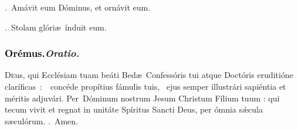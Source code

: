 \documentclass[12pt]{article} %
\def\capitulumSpace{\hspace{20 mm}}
\let\oldgresixstar\gresixstar
\renewcommand{\gresixstar}{\textcolor{benred8}{\oldgresixstar}}
\let\oldgredagger\gredagger
\renewcommand{\gredagger}{\textcolor{benred8}{\oldgredagger}}
\let\oldVbar\Vbar
\renewcommand{\Vbar}{\textcolor{benred8}{\oldVbar .}}
\let\oldRbar\Rbar
\renewcommand{\Rbar}{\textcolor{benred8}{\oldRbar .}}
\newenvironment{response}{\leftskip 0in \setlength{\parindent}{0in}}{\vspace{2 mm}}
\begin{document}




\begin{response}
\Vbar\ Am\'{a}vit eum D\'{o}minus, et orn\'{a}vit eum.

\Rbar\ Stolam gl\'{o}ri\ae\ \'{i}nduit eum.

\end{response}

\subsubsection*{\textcolor{black}{Or\'{e}mus.}\capitulumSpace \emph{Oratio.}}

\begin{response}\lettrine{D}{e}us, qui Eccl\'{e}siam tuam be\'{a}ti Bed\ae\ Confess\'{o}ris tui atque Doct\'{o}ris eruditi\'{o}ne clar\'{i}ficas~:~\gredagger\ conc\'{e}de prop\'{i}tius f\'{a}mulis tuis, \gresixstar\ ejus semper illustr\'{a}ri sapi\'{e}ntia et m\'{e}ritis adjuv\'{a}ri. Per~D\'{o}minum nostrum Jesum Christum F\'{i}lium tuum : qui tecum vivit et regnat in unit\'{a}te Sp\'{i}ritus Sancti Deus, per \'{o}mnia s\'{\ae}cula s\ae cul\'{o}rum. \Rbar\ Amen.

\end{response}




\end{document}
